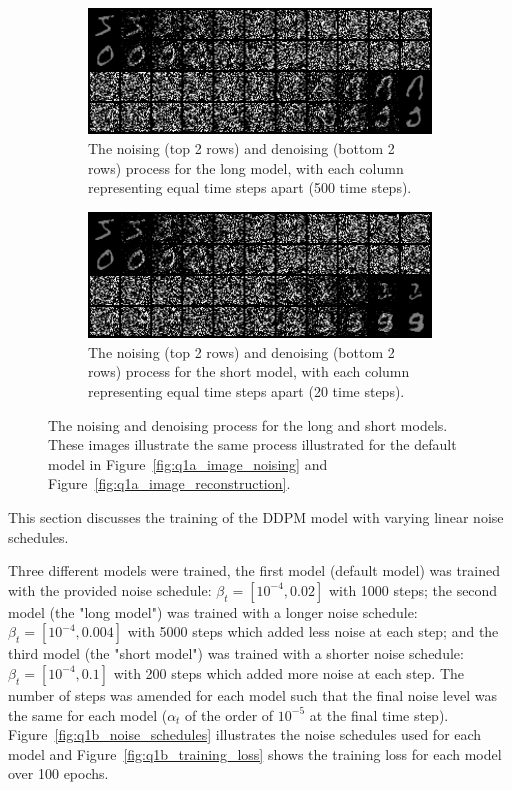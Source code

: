 \begin{figure}
\centering
\begin{subfigure}{0.8\textwidth}
    \centering
    \includegraphics[width=1\textwidth]{./figures/q1b_long_model_nd}
    \caption{The noising (top 2 rows) and denoising (bottom 2 rows) process for the long model, with each column
        representing equal time steps apart (500 time steps).}
    \label{fig:q1b_long_model_nd}
\end{subfigure}%
\hfill
\begin{subfigure}{0.8\textwidth}
    \centering
    \includegraphics[width=1\textwidth]{./figures/q1b_short_model_nd}
    \caption{The noising (top 2 rows) and denoising (bottom 2 rows) process for the short model, with each column
        representing equal time steps apart (20 time steps).}
    \label{fig:q1b_short_model_nd}
\end{subfigure}
\caption{The noising and denoising process for the long and short models.
    These images illustrate the same process illustrated for the default model in Figure~\eqref{fig:q1a_image_noising}
    and Figure~\eqref{fig:q1a_image_reconstruction}.}
\label{fig:q1b_short_long_model_nd}
\end{figure}

This section discusses the training of the DDPM model with varying linear noise schedules.

Three different models were trained, the first model (default model) was trained with the provided noise schedule:
$\beta_{t} = [10^{-4}, 0.02]$ with 1000 steps; the second model (the "long model") was trained with a longer noise schedule:
$\beta_{t} = [10^{-4}, 0.004]$ with 5000 steps which added less noise at each step; and the third model (the "short model")
was trained with a shorter noise schedule: $\beta_{t} = [10^{-4}, 0.1]$ with 200 steps which added more noise at each step.
The number of steps was amended for each model such that the final noise level was the same for each model ($\alpha_{t}$
of the order of $10^{-5}$ at the final time step).
Figure~\eqref{fig:q1b_noise_schedules} illustrates the noise schedules used for each model and Figure~\eqref{fig:q1b_training_loss}
shows the training loss for each model over 100 epochs.

